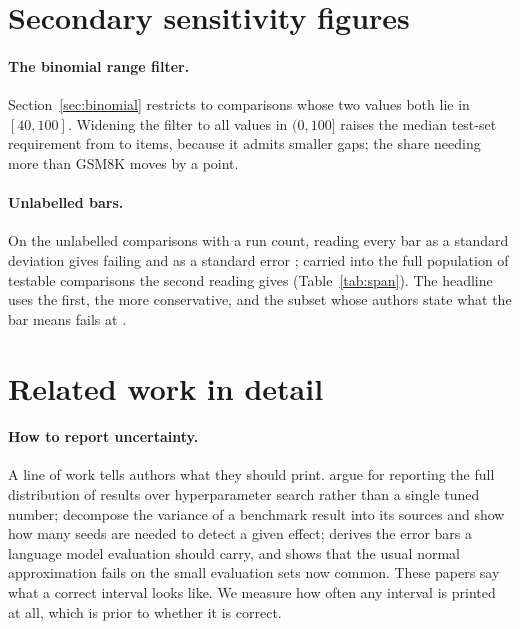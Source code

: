 \documentclass{article}
\begin{document}
\section{Secondary sensitivity figures}
\label{app:secondary}

\paragraph{The binomial range filter.} Section~\ref{sec:binomial} restricts to
comparisons whose two values both lie in $[40, 100]$. Widening the filter to
all values in $(0, 100]$ raises the median test-set requirement from
\nBinomMedianN{} to \nBinomMedianNWide{} items, because it admits smaller gaps;
the share needing more than GSM8K moves by a point.

\paragraph{Unlabelled bars.} On the \nNUnlabelled{} unlabelled comparisons with
a run count, reading every bar as a standard deviation gives
\nUnlabelledAsStd{} failing and as a standard error \nUnlabelledAsSem{}; carried
into the full population of \nSpanN{} testable comparisons the second reading
gives \nUnlabelledAsSemFull{} (Table~\ref{tab:span}). The headline uses the
first, the more conservative, and the subset whose authors state what the bar
means fails at \nLabelledOnlyFail{}.

\section{Related work in detail}
\label{app:related}

\paragraph{How to report uncertainty.} A line of work tells authors what they
should print. \citet{dodge2019show} argue for reporting the full distribution of
results over hyperparameter search rather than a single tuned number;
\citet{bouthillier2021accounting} decompose the variance of a benchmark result
into its sources and show how many seeds are needed to detect a given effect;
\citet{miller2024adding} derives the error bars a language model evaluation
should carry, and \citet{bowyer2025position} shows that the usual normal
approximation fails on the small evaluation sets now common. These papers say
what a correct interval looks like. We measure how often any interval is
printed at all, which is prior to whether it is correct.
\end{document}
